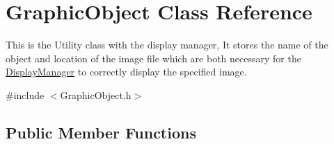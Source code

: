 \hypertarget{class_graphic_object}{}\section{Graphic\+Object Class Reference}
\label{class_graphic_object}


This is the Utility class with the display manager, It stores the name of the object and location of the image file which are both necessary for the \hyperlink{class_display_manager}{Display\+Manager} to correctly display the specified image.  




{\ttfamily \#include $<$Graphic\+Object.\+h$>$}

\subsection*{Public Member Functions}
